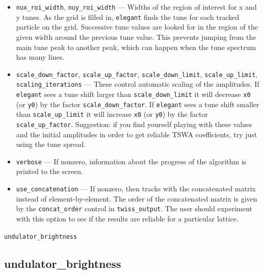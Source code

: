 \documentclass[11pt]{article}
\begin{document}
\begin{itemize}
        twiss output file under the names \verb|nuxTswaLower|, \verb|nuxTswaUpper|, and
        similarly for the y plane.  This is the recommended way to reduce tune shift
        with amplitude, as the tune spread is more reliable than the coefficients of 
        the expansion.  (Particles that get lost are automatically ignored in both
        types of computations.)
\item \verb|nux_roi_width|, \verb|nuy_roi_width| --- Widths of the region of interest for
        x and y tunes.  As the grid is filled in, {\tt elegant} finds the tune for each
        tracked particle on the grid.  Successive tune values are looked for in the
        region of the given width around the previous tune value.  This prevents jumping
        from the main tune peak to another peak, which can happen when the tune spectrum
        has many lines.
\item \verb|scale_down_factor|, \verb|scale_up_factor|, \verb|scale_down_limit|, 
        \verb|scale_up_limit|, \verb|scaling_iterations| --- These control automatic scaling
        of the amplitudes.  If {\tt elegant} sees a tune shift larger than \verb|scale_down_limit|
        it will decrease \verb|x0| (or \verb|y0|) by the factor \verb|scale_down_factor|. 
        If  {\tt elegant} sees a tune shift smaller than \verb|scale_up_limit|
        it will increase \verb|x0| (or \verb|y0|) by the factor \verb|scale_up_factor|. 
        Suggestion: if you find yourself playing with these values and the initial amplitudes
        in order to get reliable TSWA coefficients, try just using the tune spread.
\item \verb|verbose| --- If nonzero, information about the progress of the algorithm is 
        printed to the screen.
\item \verb|use_concatenation| --- If nonzero, then tracks with the concatenated matrix instead
        of element-by-element.  The order
        of the concatenated matrix is given by the \verb|concat_order| control in
        \verb|twiss_output|. The user should experiment with this option to see if the
        results are reliable for a particular lattice.
\end{itemize}

\newpage
\begin{center}{\Large\verb|undulator_brightness|}\end{center}
\subsection{undulator\_brightness \label{subsec:undulatorbrightness}}
\end{document}
